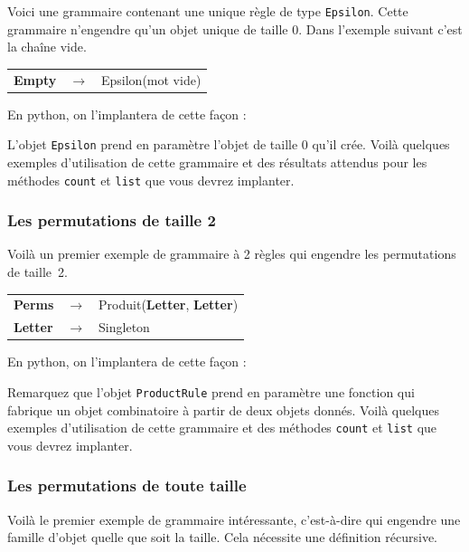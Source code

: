 \documentclass[11pt]{article}
\begin{document}
Voici une grammaire contenant une unique règle de type {\tt Epsilon}. Cette 
grammaire n'engendre qu'un objet unique de taille 0. Dans l'exemple suivant
c'est la chaîne vide.

\begin{tabular}{lll}
\textbf{Empty} & $\rightarrow$ & Epsilon(mot vide)
\end{tabular}

En python, on l'implantera de cette façon :



L'objet {\tt Epsilon} prend en paramètre l'objet de taille 0 qu'il crée. Voilà quelques exemples 
d'utilisation de cette grammaire et des résultats attendus pour les méthodes 
{\tt count} et {\tt list} que vous devrez implanter.



\subsubsection{Les permutations de taille 2}

Voilà un premier exemple de grammaire à 2 règles qui engendre les permutations de taille~2.

\begin{tabular}{lll}
\textbf{Perms} & $\rightarrow$ & Produit(\textbf{Letter}, \textbf{Letter}) \\
\textbf{Letter} & $\rightarrow$ & Singleton
\end{tabular}

En python, on l'implantera de cette façon :



Remarquez que l'objet {\tt ProductRule} prend en paramètre une fonction qui fabrique un
objet combinatoire à partir de deux objets donnés. Voilà quelques exemples 
d'utilisation de cette grammaire et des méthodes {\tt count} et {\tt list} que vous devrez implanter.



\subsubsection{Les permutations de toute taille}

Voilà le premier exemple de grammaire intéressante, c'est-à-dire qui engendre
une famille d'objet quelle que soit la taille. Cela nécessite une définition récursive.
\end{document}

